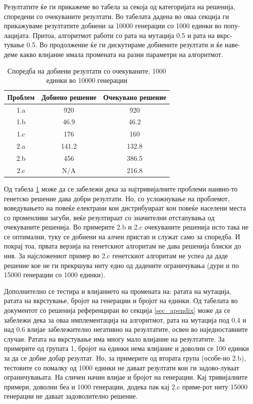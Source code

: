 \documentclass{article}
\begin{document}
Резултатите ќе ги прикажеме во табела за секоја од категоријата на решенија, споредени со очекуваните резултати. Во табелата дадена во оваа секција ги прикажуваме резултатите добиени за 10000 генерации со 1000 единки во попу-лацијата. Притоа, алгоритмот работи со рата на мутација 0.5 и рата на вкрс-тување 0.5. Во продолжение ќе ги дискутираме добиените резултати и ќе наве-деме какво влијание имала промената на разни параметри на алгоритмот. 

\begin{table}[h!]
\centering
\begin{tabular}{||c c c||} 
 \hline
 Проблем & Добиено решение & Очекувано решение \\ [0.5ex]
 \hline\hline
 1.a & 920 & 920\\ 
 1.b & 46.9 & 46.2 \\
 1.c & 176 & 160 \\
 2.a & 141.2 & 132.8 \\
 2.b & 456 & 386.5 \\
 2.c & N/A & 216.8 \\ [1ex] 
 \hline
\end{tabular}
\caption{Споредба на добиени резултати со очекуваните, 1000 единки во 10000 генерации}
\label{table_rez_ver1}
\end{table}

Од табела \ref{table_rez_ver1} може да се забележи дека за најтривијалните проблеми наивно-то генетско решение дава добри резултати. Но, со усложнување на проблемот, воведувањето на повеќе електрани кои дистрибуираат кон повеќе населени места со променливи загуби, веќе резултираат со значителни отстапувања од очекуваните решенија. Во примерите 2.b и 2.c очекуваните решенија исто така не се оптимални, туку се добиени на алчен пристап и служат само за споредба. И покрај тоа, првата верзија на генетскиот алгоритам не дава решенија блиски до нив. За најсложениот пример во 2.c генетскиот алгоритам не успеа да даде решение кое не ги прекршува ниту едно од дадените ограничувања (дури и по 15000 генерации со 1000 единки). 

Дополнително се тестира и влијанието на промената на: ратата на мутација, ратата на вкрстување, бројот на генерации и бројот на единки. Од табелата во документот со решенија референциран во секција \ref{sec_apendix} може да се забележи дека за оваа имплементација на алгоритмот, рата на мутација под 0.4 и над 0.6 влијае забележително негативно на резултатите, освен во наједноставните случаи. Ратата на вкрстување има многу мало влијание на резултатите. За примерите од групата 1, бројот на единки нема влијание и доволни се 100 единки за да се добие добар резултат. Но, за примерите од втората група (особе-но 2.b), тестовите со помалку од 1000 единки не даваат резултати кои ги задово-луваат ограничувањата. На сличен начин влијае и бројот на генерации. Кај тривијалните примери, доволни беа и 1000 генерации, додека пак кај 2.c приме-рот ниту 15000 генерации не даваат задоволително решение.
\end{document}
